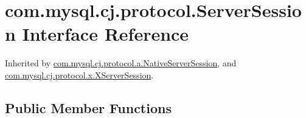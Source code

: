 \hypertarget{interfacecom_1_1mysql_1_1cj_1_1protocol_1_1_server_session}{}\section{com.\+mysql.\+cj.\+protocol.\+Server\+Session Interface Reference}
\label{interfacecom_1_1mysql_1_1cj_1_1protocol_1_1_server_session}


Inherited by \mbox{\hyperlink{classcom_1_1mysql_1_1cj_1_1protocol_1_1a_1_1_native_server_session}{com.\+mysql.\+cj.\+protocol.\+a.\+Native\+Server\+Session}}, and \mbox{\hyperlink{classcom_1_1mysql_1_1cj_1_1protocol_1_1x_1_1_x_server_session}{com.\+mysql.\+cj.\+protocol.\+x.\+X\+Server\+Session}}.

\subsection*{Public Member Functions}
